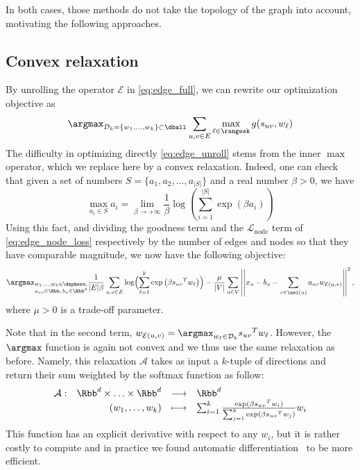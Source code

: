 In both cases, those methods do not take the topology of the graph into account, motivating the
following approaches.

\subsection{Convex relaxation}
\label{sub:edge_vector}

By unrolling the operator $\mathcal{E}$ in \eqref{eq:edge_full}, we can rewrite our optimization
objective as
\begin{equation}
  \label{eq:edge_unroll}
  \argmax_{\mathcal{D}_k = \{w_1,\ldots,w_k\} \subset \dball}
  \sum_{u,v \in E}  \max_{\ell \in \rangesk} g(s_{uv}, w_\ell)
\end{equation}
The difficulty in optimizing directly \eqref{eq:edge_unroll} stems from the inner $\max$ operator, which we
replace here by a convex relaxation. Indeed, one can check that given a set of numbers $S=\{a_1,
a_2, \ldots, a_{|S|}\}$ and a real number $\beta > 0$, we have
\begin{equation*}
  \max_{a_i \in S} a_i = \lim_{\beta \rightarrow + \infty} \frac{1}{\beta}
  \log\left( \sum_{i=1}^{|S|} \exp{(\beta a_i)} \right)
\end{equation*}
Using this fact, and dividing the goodness term and the $\mathcal{L}_{\mathrm{node}}$ term of
\eqref{eq:edge_node_loss} respectively by the number of edges and nodes so that they have comparable
magnitude, we now have the following objective:
\begin{equation}
  \label{eq:edge_soft_early}
  \argmax_{{\substack{w_1,\ldots,w_k \in \dsphere,\\
  a_{uv}\in\Rbb,\, b_u \in \Rbb^d}}}
  \frac{1}{|E|\beta} \sum_{u,v\in E}
  \log\Bigl(\sum_{\ell=1}^k\exp\left(\beta {s_{uv}}^T w_\ell \right)\Bigr)
  - \frac{\mu}{|V|}\sum_{u\in V}
  \left|\left| x_u - b_u - \sum_{v \in \nei(u)} a_{uv} w_{\mathcal{E}(u,v)} \right|\right|^2,
\end{equation}
where $\mu > 0$ is a trade-off parameter.

Note that in the second term, $w_{\mathcal{E}(u,v)} = \argmax_{w_\ell \in \mathcal{D}_k} {s_{uv}}^T
w_\ell$. However, the $\argmax$
function is again not convex and we thus use the same relaxation as before. Namely, this relaxation
$\mathcal{A}$ takes as input a $k$-tuple of directions and return their sum weighted by the softmax
function as follow:
$$ \begin{array}[t]{lrcl}
  \mathcal{A} : & \Rbb^d \times \ldots \times \Rbb^d & \longrightarrow & \Rbb^d \\
      & (w_1,\ldots,w_k) & \longmapsto &
  \sum_{i=1}^k \frac{\exp(\beta{s_{uv}}^T w_i)}{\sum_{j=1}^k \exp(\beta {s_{uv}}^T w_j)} w_i
\end{array} $$
This function has an explicit derivative with respect to any $w_i$, but it is rather costly to
compute and in practice we
found automatic differentiation~\autocite{autograd15} to be more efficient.

